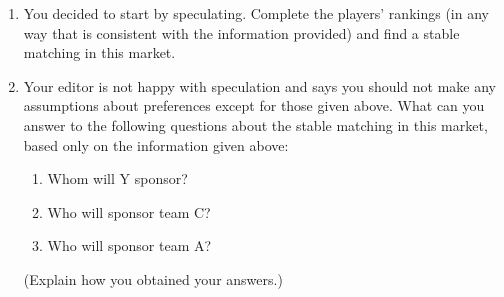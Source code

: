 \documentclass[a4paper]{article}
\newif\ifsolutions
\begin{document}
\begin{enumerate}
	\item You decided to start by speculating. Complete the players'
	rankings (in any way that is consistent with the information provided) and find a
	stable matching in this market.
	
	\item Your editor is not happy with speculation and says you should not make
	any assumptions about preferences except for those given above. What can
	you answer to the following questions about the stable matching in this
	market, based only on the information given above:
	\begin{enumerate}
		\item Whom will Y sponsor?
		\item Who will sponsor team C?
		\item Who will sponsor team A?
	\end{enumerate}
	(Explain how you obtained your answers.)
\end{enumerate}


\ifsolutions
\end{document}
